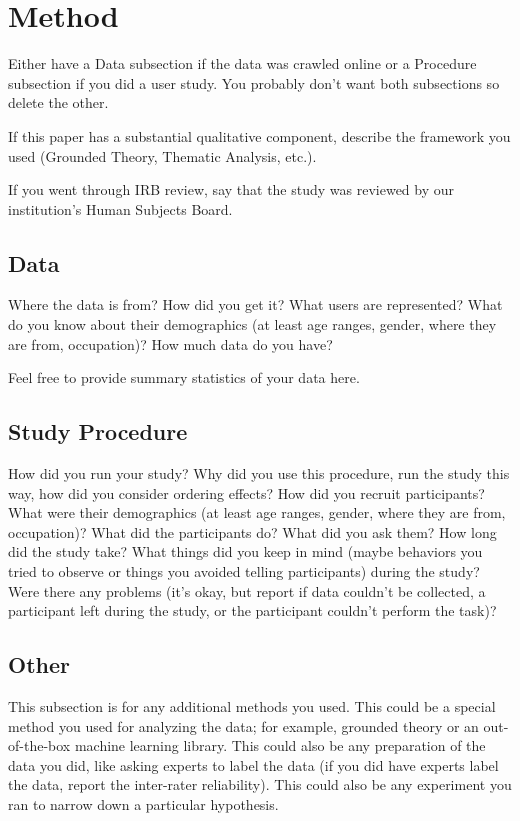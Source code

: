 \documentclass[manuscript,review,anonymous]{acmart}
\begin{document}
\section{Method}
Either have a Data subsection if the data was crawled online or a Procedure subsection if you did a user study.
You probably don't want both subsections so delete the other.

If this paper has a substantial qualitative component, describe the framework you used (Grounded Theory, Thematic Analysis, etc.).

If you went through IRB review, say that the study was reviewed by our institution's Human Subjects Board.

\subsection{Data}
Where the data is from?
How did you get it?
What users are represented?
What do you know about their demographics (at least age ranges, gender, where they are from, occupation)?
How much data do you have?

Feel free to provide summary statistics of your data here.

\subsection{Study Procedure}
How did you run your study?
Why did you use this procedure, run the study this way, how did you consider ordering effects?
How did you recruit participants?
What were their demographics (at least age ranges, gender, where they are from, occupation)?
What did the participants do?
What did you ask them?
How long did the study take?
What things did you keep in mind (maybe behaviors you tried to observe or things you avoided telling participants) during the study?
Were there any problems (it's okay, but report if data couldn't be collected, a participant left during the study, or the participant couldn't perform the task)?

\subsection{Other}
This subsection is for any additional methods you used.
This could be a special method you used for analyzing the data; for example, grounded theory or an out-of-the-box machine learning library.
This could also be any preparation of the data you did, like asking experts to label the data (if you did have experts label the data, report the inter-rater reliability).
This could also be any experiment you ran to narrow down a particular hypothesis.
\end{document}
